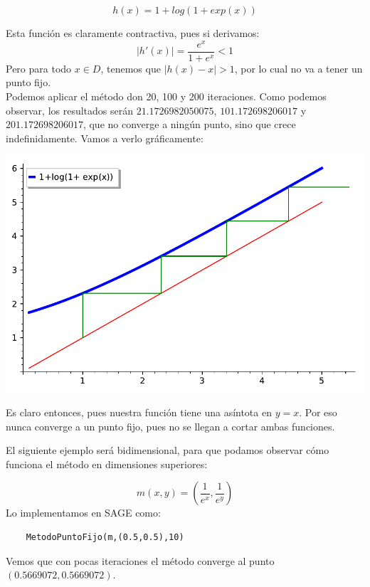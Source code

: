 \begin{example}
$$h(x) = 1+log(1+ exp(x)) $$

Esta función es claramente contractiva, pues si derivamos:
$$|h'(x)| = \frac{e^{x}}{1+e^{x}} < 1$$
Pero para todo $x \in D$, tenemos que $|h(x)-x| > 1$, por lo cual no va a tener un punto fijo.\\

Podemos aplicar el método don 20, 100 y 200 iteraciones. Como podemos observar, los resultados serán $21.1726982050075$, $101.172698206017$ y $201.172698206017$, que no converge a ningún punto, sino que crece indefinidamente. Vamos a verlo gráficamente:


\includegraphics[scale=1]{imagenes/ejemplo2_puntofijo.pdf}

Es claro entonces, pues nuestra función tiene una asíntota en $y=x$. Por eso nunca converge a un punto fijo, pues no se llegan a cortar ambas funciones.


\end{example}

El siguiente ejemplo será bidimensional, para que podamos observar cómo funciona el método en dimensiones superiores:

\begin{example}
	$$m(x,y) = (\frac{1}{e^{x}},\frac{1}{e^{y}})$$
Lo implementamos en SAGE como:
\begin{verbatim}
	MetodoPuntoFijo(m,(0.5,0.5),10)
\end{verbatim}

Vemos que con pocas iteraciones el método converge al punto $(0.5669072, 0.5669072)$.

\end{example}


